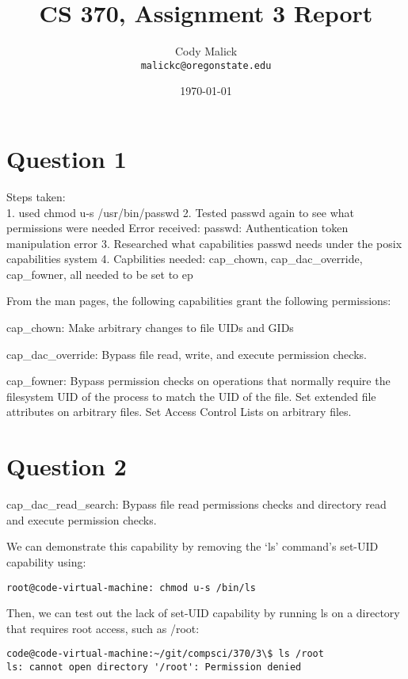 \documentclass[10pt,letterpaper]{article}
\begin{document}
\title{CS 370, Assignment 3 Report}
\author{Cody Malick\\
\texttt{malickc@oregonstate.edu}}
\date{\today}
\maketitle

\section*{Question 1}
Steps taken:\\
1. used chmod u-s /usr/bin/passwd
2. Tested passwd again to see what permissions were needed
Error received: passwd: Authentication token manipulation error
3. Researched what capabilities passwd needs under the posix capabilities system
4. Capbilities needed: cap\_chown, cap\_dac\_override, cap\_fowner, all needed to be
set to ep

From the man pages, the following capabilities grant the following permissions:

cap\_chown: Make arbitrary changes to file UIDs and GIDs

cap\_dac\_override: Bypass file read, write, and execute permission checks.

cap\_fowner: Bypass permission checks on operations that normally require the
filesystem UID of the process to match the UID of the file. Set
extended file attributes on arbitrary files. Set Access Control Lists
on arbitrary files.

\section*{Question 2}

cap\_dac\_read\_search: Bypass file read permissions checks and directory read and
	execute permission checks.

We can demonstrate this capability by removing the `ls' command's set-UID capability
using:
\begin{lstlisting}[caption=Removing set-UID capability on ls]
root@code-virtual-machine: chmod u-s /bin/ls
\end{lstlisting}

Then, we can test out the lack of set-UID capability by running ls on a directory
that requires root access, such as /root:

\begin{lstlisting}
code@code-virtual-machine:~/git/compsci/370/3\$ ls /root
ls: cannot open directory '/root': Permission denied
\end{lstlisting}
\end{document}
